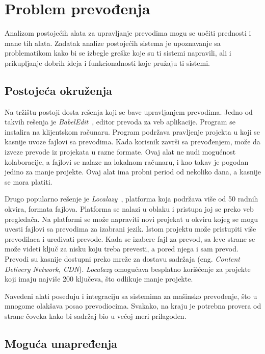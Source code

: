 \section{Problem prevođenja}\label{ch:analiza}

Analizom postojećih alata za upravljanje prevodima mogu se uočiti prednosti i mane tih alata. 
Zadatak analize postojećih sistema je upoznavanje sa problematikom kako bi se izbegle greške
koje su ti sistemi napravili, ali i prikupljanje dobrih ideja i funkcionalnosti koje pružaju ti sistemi.


\subsection{Postojeća okruženja}\label{sec:analiza-postojeca_okruzenja}

Na tržištu postoji dosta rešenja koji se bave upravljanjem prevodima. Jedno od takvih rešenja je 
\textit{BabelEdit}~\cite{BabelEdit}, editor prevoda za veb aplikacije. Program se instalira na klijentskom računaru.
Program podržava pravljenje projekta u koji se kasnije uvoze fajlovi sa prevodima. Kada korisnik završi 
sa prevođenjem, može da izveze prevode iz projekata u razne formate. Ovaj alat ne nudi mogućnost kolaboracije,
a fajlovi se nalaze na lokalnom računaru, i kao takav je pogodan jedino za manje projekte. Ovaj alat ima 
probni period od nekoliko dana, a kasnije se mora platiti.

Drugo popularno rešenje je \textit{Localazy}~\cite{Localazy}, platforma koja podržava više od 50 radnih okvira, 
formata fajlova. Platforma se nalazi u oblaku i pristupa joj se preko veb pregledača. Na platformi se može 
napraviti novi projekat u okviru kojeg se mogu uvesti fajlovi sa prevodima za izabrani jezik. Istom projektu 
može pristupiti više prevodilaca i uređivati prevode. Kada se izabere fajl za prevod, sa leve strane se može 
videti ključ za nisku koju treba prevesti, a pored njega i sam prevod. Prevodi su kasnije dostupni preko 
mreže za dostavu sadržaja (eng. \textit{Content Delivery Network, CDN}). \textit{Localazy} omogućava besplatno korišćenje za 
projekte koji imaju najviše 200 ključeva, što odlikuje manje projekte.

Navedeni alati poseduju i integraciju sa sistemima za mašinsko prevođenje, što u mnogome olakšava posao 
prevodiocima. Svakako, na kraju je potrebna provera od strane čoveka kako bi sadržaj bio u većoj meri prilagođen. 


\subsection{Moguća unapređenja}\label{sec:analiza-moguca_unapredjenja}

